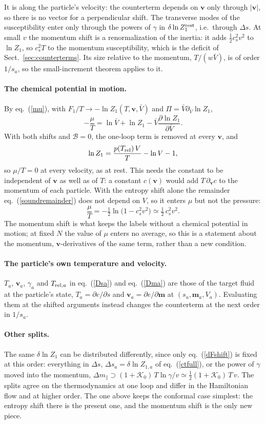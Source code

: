 \documentclass[11pt,aps,preprint,nofootinbib,superscriptaddress,tightenlines]{revtex4-2}
\newcommand{\klab}{\mathcal B}
\def\st{\begin{equation}}
\def\stp{\end{equation}}
\def\Eq#1{eq.~(\ref{#1})}
\def\Sect#1{Sect.~\ref{#1}}
\let\oldparagraph\paragraph
\renewcommand{\paragraph}{\par\bigskip\oldparagraph}
\begin{document}
It is along the particle's velocity: the counterterm depends on $\bm v$ only through $|\bm v|$, so there is no vector for a perpendicular shift.  The transverse modes of the
susceptibility enter only through the powers of $\gamma$ in $\delta\ln Z_1^{\rm rest}$, i.e.\ through $\Delta s$.  At small $v$ the momentum shift is a renormalization of the inertia: it adds
$\tfrac12c_s^2v^2$ to $\ln Z_1$, so $c_s^2T$ to the momentum susceptibility, which is the deficit of \Sect{sec:counterterms}.  Its size relative to the momentum, $T/(w\bar V)$, is of
order $1/s_a$, so the small-increment theorem applies to it.

\paragraph{The chemical potential in motion.}  By \Eq{mu}, with $F_1/T\to-\ln Z_1(T,\bm v,\bar V)$ and $\Pi=\bar V\partial_{\bar V}\ln Z_1$,
\st
-\frac\mu T=\ln\bar V+\ln Z_1-\bar V\frac{\partial\ln Z_1}{\partial\bar V} .
\stp
With both shifts and $\klab=0$, the one-loop term is removed at every $\bm v$, and
\st
\ln Z_1=\frac{p(T_{\rm rel})\,V}T-\ln V-1 ,
\stp
so $\mu/T=0$ at every velocity, as at rest.  This needs the constant to be independent of $\bm v$ as well as of $T$: a constant $c(\bm v)$ would add $T\,\partial_{\bm v}c$ to the
momentum of each particle.  With the entropy shift alone the remainder \Eq{soundremainder} does not depend on $V$, so it enters $\mu$ but not the pressure:
\st
\frac\mu T=-\tfrac12\ln\big(1-c_s^2v^2\big)\simeq\tfrac12\,c_s^2v^2 .
\stp
The momentum shift is what keeps the labels without a chemical potential in motion; at fixed $N$ the value of $\mu$ enters no average, so this is a statement about
the momentum, $\bm v$-derivatives of the same term, rather than a new condition.

\paragraph{The particle's own temperature and velocity.}  $T_a$, $\bm v_a$, $\gamma_a$ and $T_{{\rm rel},a}$ in \Eq{Dsa} and \Eq{Dma} are those of the target fluid at the particle's state,
$T_a=\partial e/\partial s$ and $\bm v_a=\partial e/\partial\bm m$ at $(s_a,\bm m_a,V_a)$.  Evaluating them at the shifted arguments instead changes the counterterm at the next order in
$1/s_a$.

\paragraph{Other splits.}  The same $\delta\ln Z_1$ can be distributed differently, since only \Eq{dFshift} is fixed at this order: everything in $\Delta s$, $\Delta s_a=\delta\ln Z_{1,a}$ of \Eq{ctfull}, or the power of $\gamma$
moved into the momentum, $\Delta m_\parallel\supset(1+\mathcal K_0)\,T\ln\gamma/v\simeq\tfrac12(1+\mathcal K_0)\,T\,v$.  The splits agree on the thermodynamics at one loop and differ in
the Hamiltonian flow and at higher order.  The one above keeps the conformal case simplest: the entropy shift there is the present one, and the momentum shift is the
only new piece.
\end{document}
